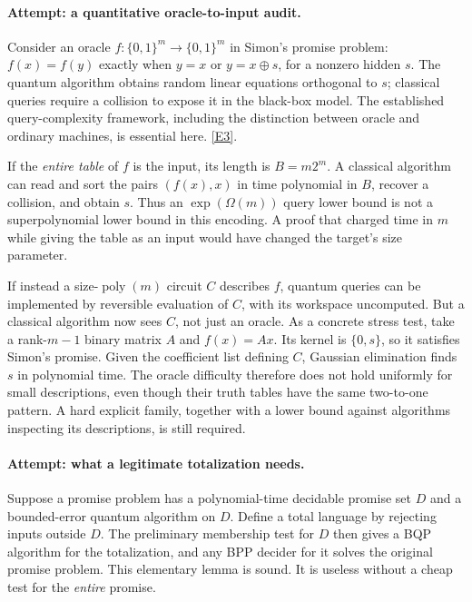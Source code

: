 \documentclass[11pt,a4paper]{article}
\newcommand{\eref}[2]{\hyperlink{extra:#1:#2}{[E#2]}}
\begin{document}
\paragraph{Attempt: a quantitative oracle-to-input audit.}
Consider an oracle $f:\{0,1\}^m\to\{0,1\}^m$ in Simon's promise problem:
$f(x)=f(y)$ exactly when $y=x$ or $y=x\oplus s$, for a nonzero hidden $s$.
The quantum algorithm obtains random linear equations orthogonal to $s$;
classical queries require a collision to expose it in the black-box model.
The established query-complexity framework, including the distinction
between oracle and ordinary machines, is essential here. \eref{statement}{3}.

If the \emph{entire table} of $f$ is the input, its length is
$B=m2^m$. A classical algorithm can read and sort the pairs $(f(x),x)$ in
time polynomial in $B$, recover a collision, and obtain $s$. Thus an
$\exp(\Omega(m))$ query lower bound is not a superpolynomial lower bound
in this encoding. A proof that charged time in $m$ while giving the table
as an input would have changed the target's size parameter.

If instead a size-$\operatorname{poly}(m)$ circuit $C$ describes $f$, quantum
queries can be implemented by reversible evaluation of $C$, with its
workspace uncomputed. But a classical algorithm now sees $C$, not just
an oracle. As a concrete stress test, take a rank-$m-1$ binary matrix $A$
and $f(x)=Ax$. Its kernel is $\{0,s\}$, so it satisfies Simon's promise.
Given the coefficient list defining $C$, Gaussian elimination finds $s$
in polynomial time. The oracle difficulty therefore does not hold
uniformly for small descriptions, even though their truth tables have the
same two-to-one pattern. A hard explicit family, together with a lower
bound against algorithms inspecting its descriptions, is still required.

\paragraph{Attempt: what a legitimate totalization needs.}
Suppose a promise problem has a polynomial-time decidable promise set $D$
and a bounded-error quantum algorithm on $D$. Define a total language by
rejecting inputs outside $D$. The preliminary membership test for $D$
then gives a BQP algorithm for the totalization, and any BPP decider for
it solves the original promise problem. This elementary lemma is sound.
It is useless without a cheap test for the \emph{entire} promise.
\end{document}
